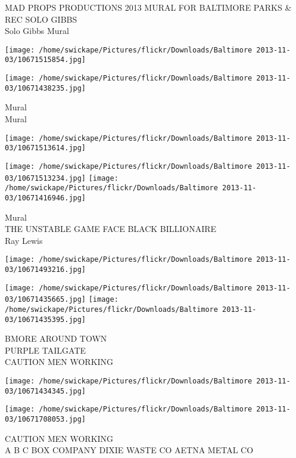 \documentclass[10pt,letterpaper]{article}
\begin{document}
MAD PROPS PRODUCTIONS 2013 MURAL FOR BALTIMORE PARKS \& REC SOLO GIBBS\\
Solo Gibbs Mural\\
\pagebreak

\texttt{[image: /home/swickape/Pictures/flickr/Downloads/Baltimore 2013-11-03/10671515854.jpg]}

\vspace{0.25in}
\texttt{[image: /home/swickape/Pictures/flickr/Downloads/Baltimore 2013-11-03/10671438235.jpg]}

Mural\\
Mural\\
\pagebreak

\texttt{[image: /home/swickape/Pictures/flickr/Downloads/Baltimore 2013-11-03/10671513614.jpg]}

\vspace{0.25in}
\texttt{[image: /home/swickape/Pictures/flickr/Downloads/Baltimore 2013-11-03/10671513234.jpg]}
\texttt{[image: /home/swickape/Pictures/flickr/Downloads/Baltimore 2013-11-03/10671416946.jpg]}

Mural\\
THE UNSTABLE GAME FACE BLACK BILLIONAIRE\\
Ray Lewis\\
\pagebreak

\texttt{[image: /home/swickape/Pictures/flickr/Downloads/Baltimore 2013-11-03/10671493216.jpg]}

\vspace{0.25in}
\texttt{[image: /home/swickape/Pictures/flickr/Downloads/Baltimore 2013-11-03/10671435665.jpg]}
\texttt{[image: /home/swickape/Pictures/flickr/Downloads/Baltimore 2013-11-03/10671435395.jpg]}

BMORE AROUND TOWN\\
PURPLE TAILGATE\\
CAUTION MEN WORKING\\
\pagebreak

\texttt{[image: /home/swickape/Pictures/flickr/Downloads/Baltimore 2013-11-03/10671434345.jpg]}

\vspace{0.25in}
\texttt{[image: /home/swickape/Pictures/flickr/Downloads/Baltimore 2013-11-03/10671708053.jpg]}

CAUTION MEN WORKING\\
A B C BOX COMPANY DIXIE WASTE CO AETNA METAL CO\\
\pagebreak
\end{document}
